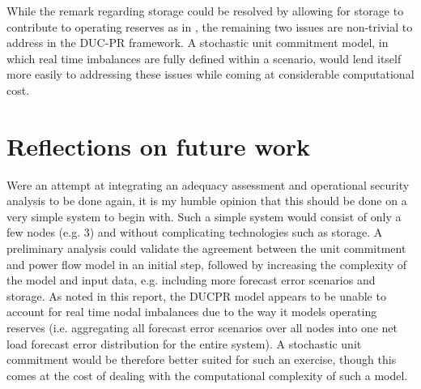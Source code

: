 \documentclass[number,times]{elsarticle}
\begin{document}
While the remark regarding storage could be resolved by allowing for storage to contribute to operating reserves as in \cite{Bruninx2016}, the remaining two issues are non-trivial to address in the DUC-PR framework. A stochastic unit commitment model, in which real time imbalances are fully defined within a scenario, would lend itself more easily to addressing these issues while coming at considerable computational cost.

\section{Reflections on future work}

Were an attempt at integrating an adequacy assessment and operational security analysis to be done again, it is my humble opinion that this should be done on a very simple system to begin with. Such a simple system would consist of only a few nodes (e.g. 3) and without complicating technologies such as storage. A preliminary analysis could validate the agreement between the unit commitment and power flow model in an initial step, followed by increasing the complexity of the model and input data, e.g. including more forecast error scenarios and storage. As noted in this report, the \ac{DUCPR} model appears to be unable to account for real time nodal imbalances due to the way it models operating reserves (i.e. aggregating all forecast error scenarios over all nodes into one net load forecast error distribution for the entire system). A stochastic unit commitment would be therefore better suited for such an exercise, though this comes at the cost of dealing with the computational complexity of such a model.

\clearpage


\end{document}
